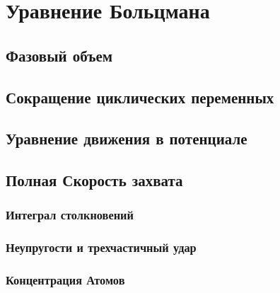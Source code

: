 


	
	\section{Уравнение Больцмана}
	\subsection{Фазовый объем}
	
	\subsection{Сокращение циклических переменных}
	
	\subsection{Уравнение движения в потенциале}
	
	\subsection{Полная Скорость захвата}
		
	\subsubsection{Интеграл столкновений}
	
	\subsubsection{Неупругости и трехчастичный удар}
	
	\subsubsection{Концентрация Атомов}
	
	
